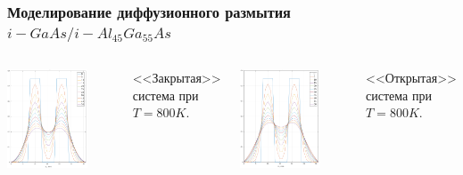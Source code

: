 \documentclass[10pt,pdf,hyperref={unicode},aspectratio={169}]{beamer}
\begin{document}
\begin{frame}
	\frametitle{Моделирование диффузионного размытия $i\!-\!GaAs/i\!-\!Al_{45}Ga_{55}As$}
	\begin{columns}
		\begin{center}
			\includegraphics[width=0.75\textwidth]{assets/D1CAlGaAs}
		\end{center}
		<<Закрытая>> система при $T = 800K$.
		\begin{center}
			\includegraphics[width=0.75\textwidth]{assets/D1OAlGaAs}
		\end{center}
		<<Открытая>> система при $T = 800K$.
	\end{columns}
\end{frame}
\end{document}
